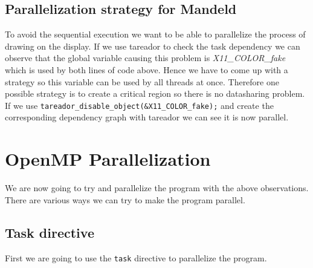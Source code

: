 \documentclass[11pt]{article}
\begin{document}
\subsection{Parallelization strategy for Mandeld}
\label{sec:org733af78}
To avoid the sequential execution we want to be able to parallelize the process of drawing on the display. If we use tareador to check the task dependency we can observe that the global variable causing this problem is \emph{X11\_COLOR\_fake} which is used by both lines of code above. Hence we have to come up with a strategy so this variable can be used by all threads at once. Therefore one possible strategy is to create a critical region so there is no datasharing problem. If we use \texttt{tareador\_disable\_object(\&X11\_COLOR\_fake);} and create the corresponding dependency graph with tareador we can see it is now parallel.

\section{OpenMP Parallelization}

We are now going to try and parallelize the program with the above observations. There are various ways we can try to make the program parallel.

\subsection{Task directive}
First we are going to use the \texttt{task} directive to parallelize the program.
\end{document}
